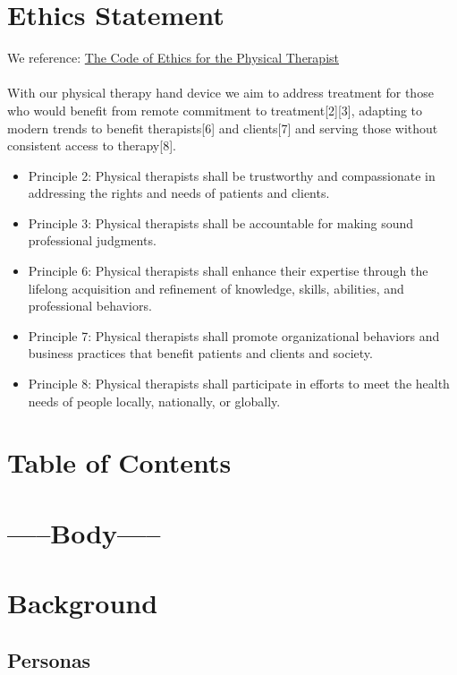\documentclass{article}
\begin{document}
\section{Ethics Statement}
We reference: \href{https://www.apta.org/siteassets/pdfs/policies/codeofethicshods06-20-28-25.pdf}{The Code of Ethics for the Physical Therapist} \\ \\ 
With our physical therapy hand device we aim to address treatment for those who would
benefit from remote commitment to treatment[2][3], adapting to modern trends to benefit
therapists[6] and clients[7] and serving those without consistent access to therapy[8].
\begin{itemize}
\item Principle 2: Physical therapists shall be trustworthy and compassionate in addressing the
rights and needs of patients and clients.
\item Principle 3: Physical therapists shall be accountable for making sound professional judgments.
\item Principle 6: Physical therapists shall enhance their expertise through the lifelong acquisition
and refinement of knowledge, skills, abilities, and professional behaviors.
\item Principle 7: Physical therapists shall promote organizational behaviors and business practices
that benefit patients and clients and society.
\item Principle 8: Physical therapists shall participate in efforts to meet the health needs of people locally, nationally, or globally.
\end{itemize}

\section{Table of Contents}


\section{\bf{-----Body-----}}
\section{Background}

\subsection{Personas}
\end{document}
